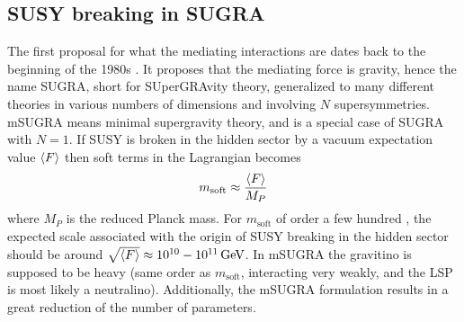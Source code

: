 \subsection*{SUSY breaking in SUGRA}
\noindent\justify
The first proposal for what the mediating interactions are dates back to the beginning of the 1980s \cite{Chamseddine:1982jx,Barbieri:1982eh,Ibanez:1982ee,Hall:1983iz,Ellis:1982wr}.
It proposes that the mediating force is gravity, hence the name SUGRA, short for SUperGRAvity theory, generalized to many different theories in various numbers of dimensions and involving $N$ supersymmetries. 
mSUGRA means minimal supergravity theory, and is a special case of SUGRA with $N=1$. 
If SUSY is broken in the hidden sector by a vacuum expectation value $\braket{F}$ then soft terms in the Lagrangian becomes
\begin{equation}
m_{\mathrm{soft}}\approx\frac{\braket{F}}{M_{P}}
\end{equation}
where $M_{P}$ is the reduced Planck mass. 
For $m_{\mathrm{soft}}$ of order a few hundred \GeV, the expected scale associated with the origin of SUSY breaking in the hidden sector should be around $\sqrt{\braket{F}}\approx10^{10}-10^{11}\,\text{Ge\hspace{-.08em}V}$.
In mSUGRA the gravitino is supposed to be heavy (same order as $m_{\mathrm{soft}}$, interacting very weakly, and the LSP is most likely a neutralino). 
Additionally, the mSUGRA formulation results in a great reduction of the number of parameters.  
